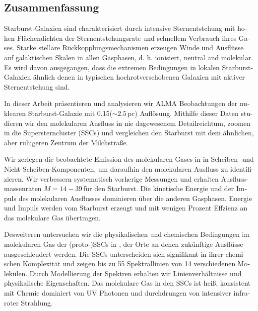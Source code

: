 \begin{otherlanguage}{ngerman}

\chapter*{Zusammenfassung}


Starburst-Galaxien sind charakterisiert durch intensive Sternentstehung mit hohen Flächendichten der  Sternentstehungsrate und schnellem Verbrauch ihres Gases.
Starke stellare Rückkopplungsmechanismen erzeugen Winde und Ausflüsse auf galaktischen Skalen in allen Gasphasen, d. h. ionisiert, neutral and molekular.
Es wird davon ausgegangen, dass die extremen Bedingungen in lokalen Starburst-Galaxien ähnlich denen in typischen hochrotverschobenen Galaxien mit aktiver Sternentstehung sind. 

In dieser Arbeit präsentieren und analysieren wir ALMA Beobachtungen der nuklearen Starburst-Galaxie  mit 0.15\arcsec ($\sim 2.5$\,pc) Auflösung.
Mithilfe dieser Daten studieren wir den molekularen Ausfluss in nie dagewesenem Detailreichtum, zoomen in die Supersterncluster (SSCs) und vergleichen den Starburst mit dem ähnlichen, aber ruhigeren Zentrum der Milchstraße.

Wir zerlegen die beobachtete Emission des molekularen Gases in  in Scheiben- und Nicht-Scheiben-Komponenten, um daraufhin den molekularen Ausfluss zu identifizieren.
Wir verbessern systematisch vorherige Messungen und erhalten Ausflussmassenraten $\dot{M} = 14-39$\,\Msunyr für den Starburst.
Die kinetische Energie und der Impuls des molekularen Ausflusses dominieren über die anderen Gasphasen.
Energie und Impuls werden vom Starburst erzeugt und mit wenigen Prozent Effzienz an das molekulare Gas übertragen.

Desweiteren untersuchen wir die physikalischen und chemischen Bedingungen im molekularen Gas der (proto-)SSCs in , der Orte an denen zukünftige Ausflüsse ausgeschleudert werden.
Die SSCs unterscheiden sich signifikant in ihrer chemischen Komplexität und zeigen bis zu 55 Spektrallinien von 14 verschiedenen Molekülen.
Durch Modellierung der Spektren erhalten wir Linienverhältnisse und physikalische Eigenschaften.
Das molekulare Gas in den SSCs ist heiß, konsistent mit Chemie dominiert von UV Photonen und durchdrungen von intensiver infraroter Strahlung.


\end{otherlanguage}
